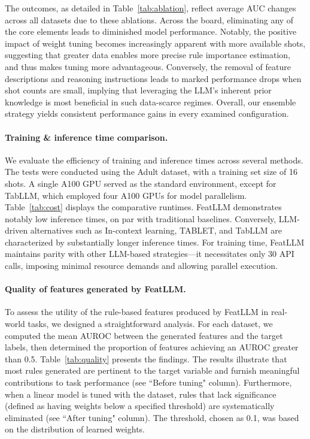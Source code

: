 The outcomes, as detailed in Table~\ref{tab:ablation}, reflect average AUC changes across all datasets due to these ablations. Across the board, eliminating any of the core elements leads to diminished model performance. Notably, the positive impact of weight tuning becomes increasingly apparent with more available shots, suggesting that greater data enables more precise rule importance estimation, and thus makes tuning more advantageous. Conversely, the removal of feature descriptions and reasoning instructions leads to marked performance drops when shot counts are small, implying that leveraging the LLM’s inherent prior knowledge is most beneficial in such data-scarce regimes. Overall, our ensemble strategy yields consistent performance gains in every examined configuration.

\vspace*{-0.12in}
\paragraph{Training \& inference time comparison.} We evaluate the efficiency of training and inference times across several methods. The tests were conducted using the Adult dataset, with a training set size of 16 shots. A single A100 GPU served as the standard environment, except for TabLLM, which employed four A100 GPUs for model parallelism. Table~\ref{tab:cost} displays the comparative runtimes. \textsf{FeatLLM} demonstrates notably low inference times, on par with traditional baselines. Conversely, LLM-driven alternatives such as In-context learning, TABLET, and TabLLM are characterized by substantially longer inference times. For training time, \textsf{FeatLLM} maintains parity with other LLM-based strategies—it necessitates only 30 API calls, imposing minimal resource demands and allowing parallel execution.

\vspace*{-0.12in}
\paragraph{Quality of features generated by \textsf{FeatLLM}.}
To assess the utility of the rule-based features produced by \textsf{FeatLLM} in real-world tasks, we designed a straightforward analysis. For each dataset, we computed the mean AUROC between the generated features and the target labels, then determined the proportion of features achieving an AUROC greater than 0.5. Table~\ref{tab:quality} presents the findings. The results illustrate that most rules generated are pertinent to the target variable and furnish meaningful contributions to task performance (see ``Before tuning" column). Furthermore, when a linear model is tuned with the dataset, rules that lack significance (defined as having weights below a specified threshold) are systematically eliminated (see ``After tuning" column). The threshold, chosen as 0.1, was based on the distribution of learned weights.

